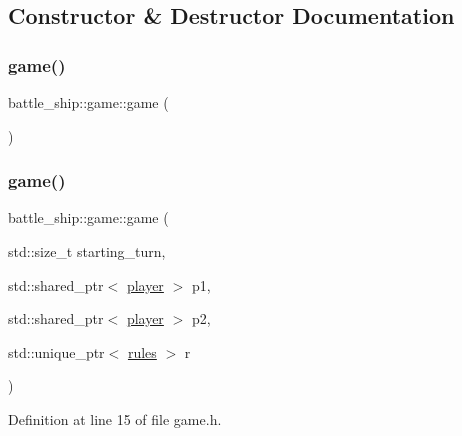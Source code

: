 \subsection{Constructor \& Destructor Documentation}
\mbox{\label{classbattle__ship_1_1game_a3a98cd01dec3c29d91d057049c421c89}} 
\subsubsection{\texorpdfstring{game()}{game()}\hspace{0.1cm}{\footnotesize\ttfamily [1/2]}}
{\footnotesize\ttfamily battle\+\_\+ship\+::game\+::game (\begin{DoxyParamCaption}{ }\end{DoxyParamCaption})\hspace{0.3cm}{\ttfamily [default]}}

\mbox{\label{classbattle__ship_1_1game_a172670fffc6e5b3942ddcd41b2f2840a}} 
\subsubsection{\texorpdfstring{game()}{game()}\hspace{0.1cm}{\footnotesize\ttfamily [2/2]}}
{\footnotesize\ttfamily battle\+\_\+ship\+::game\+::game (\begin{DoxyParamCaption}\item[{std\+::size\+\_\+t}]{starting\+\_\+turn,  }\item[{std\+::shared\+\_\+ptr$<$ \hyperlink{classbattle__ship_1_1player}{player} $>$}]{p1,  }\item[{std\+::shared\+\_\+ptr$<$ \hyperlink{classbattle__ship_1_1player}{player} $>$}]{p2,  }\item[{std\+::unique\+\_\+ptr$<$ \hyperlink{classbattle__ship_1_1rules}{rules} $>$}]{r }\end{DoxyParamCaption})\hspace{0.3cm}{\ttfamily [inline]}}



Definition at line 15 of file game.\+h.

\mbox{\label{classbattle__ship_1_1game_aa95dac5c30c567ae407a3b67ceae324d}} 
